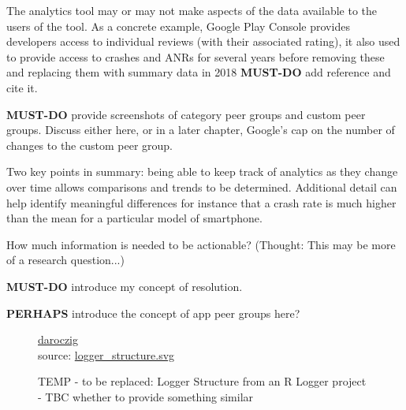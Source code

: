 The analytics tool may or may not make aspects of the data available to the users of the tool. As a concrete example, Google Play Console provides developers access to individual reviews (with their associated rating), it also used to provide access to crashes and ANRs for several years before removing these and replacing them with summary data in 2018 \textbf{MUST-DO} add reference and cite it.

\textbf{MUST-DO} provide screenshots of category peer groups and custom peer groups. Discuss either here, or in a later chapter, Google's cap on the number of changes to the custom peer group.

Two key points in summary: being able to keep track of analytics as they change over time allows comparisons and trends to be determined. Additional detail can help identify meaningful differences for instance that a crash rate is much higher than the mean for a particular model of smartphone. 

How much information is needed to be actionable? (Thought: This may be more of a research question...)


\textbf{MUST-DO} introduce my concept of resolution.

\textbf{PERHAPS} introduce the concept of app peer groups here?

\begin{figure}
    {\textcopyright \href{{https://twitter.com/daroczig}}{daroczig}\\source: \href{https://github.com/daroczig/logger/blob/master/vignettes/logger_structure.svg}{logger\_structure.svg}}
    \caption{TEMP - to be replaced: Logger Structure from an R Logger project - TBC whether to provide something similar}
    \label{fig:temp_logger_structure}
\end{figure}

